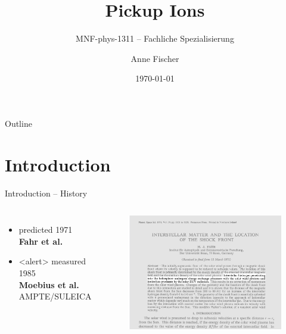 \documentclass{beamer}
\title{Pickup Ions}
\subtitle{MNF-phys-1311 -- Fachliche Spezialisierung}
\author{Anne Fischer}
\date{\today}
\begin{document}
\begin{frame}[plain]
	\titlepage
\end{frame}
\begin{frame}[plain]{Outline}
	\tableofcontents
\end{frame}
\section{Introduction}
\begin{frame}{Introduction -- History}
\begin{columns}
	\column{4cm}
		\begin{itemize}
			\item predicted 1971\\ \textbf{Fahr et al.} 
			\item<alert> measured 1985\\ \textbf{Moebius et al.} \\ AMPTE/SULEICA
		\end{itemize}
	\column{6.5cm}
		\begin{figure}									
			\flushleft
			\includegraphics[scale=0.15]{pictures/Screenshot_Fahr_E.png}
			\end{figure}
\end{columns}
\end{frame}
\end{document}

